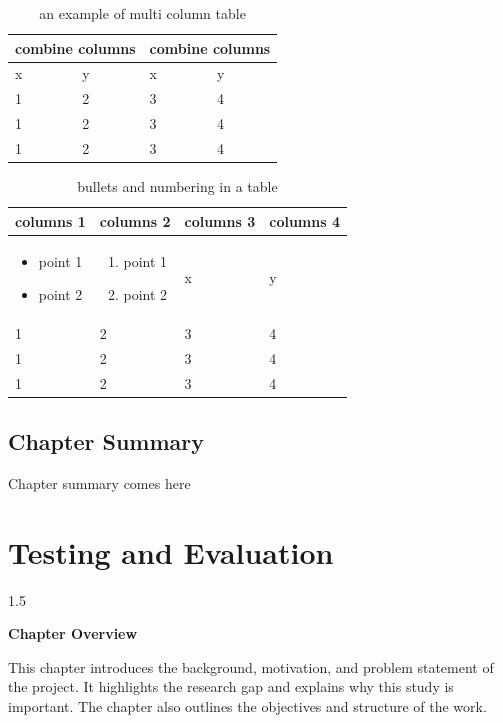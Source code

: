 \documentclass[A4paper,12pt]{report}
\theoremstyle{plain}
\theoremstyle{definition}
\theoremstyle{remark}
\numberwithin{equation}{section}
\begin{document}
\begin{table}[h]
	\centering
	\caption{an example of multi column table}
	\begin{tabular}[c]{|p{3cm}|p{3cm}|p{3cm}|p{3cm}|}
		\toprule
		\multicolumn{2}{c}{combine columns} & \multicolumn{2}{c}{combine columns} \\
		\midrule
		x&y&x&y\\
		\midrule
		1&2&3&4\\

		1&2&3&4\\

		1&2&3&4\\
		\bottomrule
	\end{tabular}
\end{table}

\begin{table}[h]
	\centering
	\caption{bullets and numbering in a table}
	\begin{tabular}[c]{|p{3cm}|p{3cm}|p{3cm}|p{3cm}|}
		\toprule
		columns 1 & columns 2 & columns 3 & columns 4 \\
		\midrule
		\begin{itemize}[leftmargin=10px]
			\item point 1
			\item point 2
		\end{itemize}&
		\begin{enumerate}[leftmargin=10px]
		\item point 1
		\item point 2
		\end{enumerate}&x&y\\
		\midrule
		1&2&3&4\\
		
		1&2&3&4\\
		
		1&2&3&4\\
		\bottomrule
	\end{tabular}
\end{table}
\section{Chapter Summary}
Chapter summary comes here


\chapter{Testing and Evaluation}
\thispagestyle{empty}
\newpage
\begin{spacing}{1.5}

\thispagestyle{empty}

{\centering \Large \bfseries Chapter Overview \par}
\vspace{1cm} %

This chapter introduces the background, motivation, and problem
statement of the project. It highlights the research gap and explains
why this study is important. The chapter also outlines the objectives
and structure of the work.

\end{spacing}
\end{document}
